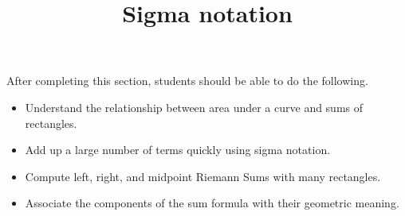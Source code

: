 \documentclass{ximera}
\title{Sigma notation}
\begin{document}
\begin{abstract}
\end{abstract}

\maketitle

\begin{sectionOutcomes}

After completing this section, students should be able to do the following.

\begin{itemize}
	\item Understand the relationship between area under a curve and sums of rectangles.
	\item Add up a large number of terms quickly using sigma notation.
	\item Compute left, right, and midpoint Riemann Sums with many rectangles.
	\item Associate the components of the sum formula with their geometric meaning.
\end{itemize}

\end{sectionOutcomes}
\end{document}
